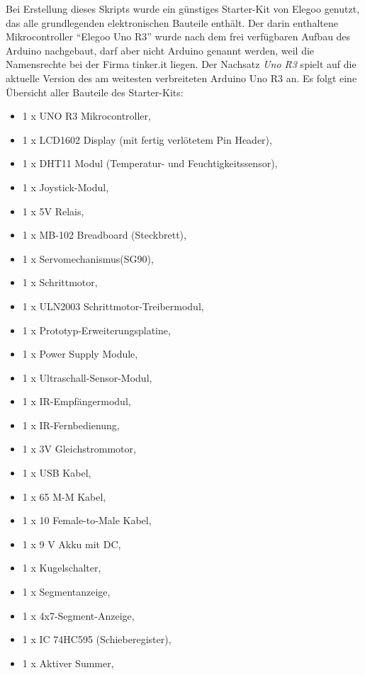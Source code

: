 Bei Erstellung dieses Skripts wurde ein günstiges Starter-Kit von Elegoo genutzt, das alle grundlegenden elektronischen Bauteile enthält. Der darin enthaltene Mikrocontroller \enquote{Elegoo Uno R3} wurde nach dem frei verfügbaren Aufbau des Arduino nachgebaut, darf aber nicht Arduino genannt werden, weil die Namensrechte bei der Firma tinker.it liegen. Der Nachsatz \emph{Uno R3} spielt auf die aktuelle Version des am weitesten verbreiteten Arduino Uno R3 an. Es folgt eine Übersicht aller Bauteile des Starter-Kits:
\begin{multicols}{2}
	\begin{itemize}
		\item 1 x UNO R3 Mikrocontroller,
		\item 1 x LCD1602 Display (mit fertig verlötetem Pin Header),
		\item 1 x DHT11 Modul (Temperatur- und Feuchtigkeitssensor),
		\item 1 x Joystick-Modul,
		\item 1 x 5V Relais,
		\item 1 x MB-102 Breadboard (Steckbrett),
		\item 1 x Servomechanismus(SG90),
		\item 1 x Schrittmotor,
		\item 1 x ULN2003 Schrittmotor-Treibermodul,
		\item 1 x Prototyp-Erweiterungsplatine,
		\item 1 x Power Supply Module,
		\item 1 x Ultraschall-Sensor-Modul,
		\item 1 x IR-Empfängermodul,
		\item 1 x IR-Fernbedienung,
		\item 1 x 3V Gleichstrommotor,
		\item 1 x USB Kabel,
		\item 1 x 65 M-M Kabel,
		\item 1 x 10 Female-to-Male Kabel,
		\item 1 x 9 V Akku mit DC,
		\item 1 x Kugelschalter,
		\item 1 x Segmentanzeige,
		\item 1 x 4x7-Segment-Anzeige,
		\item 1 x IC 74HC595 (Schieberegister),
		\item 1 x Aktiver Summer,

\end{itemize}
\end{multicols}
